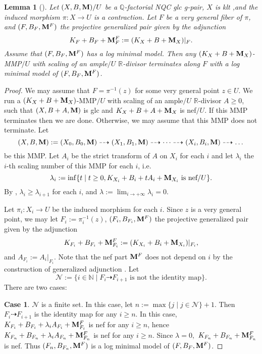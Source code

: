 \documentclass[11pt]{amsart}
\numberwithin{equation}{section}
\newcommand{\Mm}{{\bf{M}}}
\newcommand{\Qq}{\mathbb{Q}}
\newcommand{\Rr}{\mathbb{R}}
\newtheorem{lem}[thm]{Lemma}
\theoremstyle{definition}
\theoremstyle{definition}
\theoremstyle{definition}
\begin{document}
\begin{lem}[{\cite[Version 2, Lemma 2.40]{HL21}}]\label{lem: termination along a very general fiber}
Let $(X,B,\Mm)/U$ be a $\Qq$-factorial NQC glc g-pair, $X$ is klt ,and the induced morphism $\pi: X\rightarrow U$ is a contraction. Let $F$ be a very general fiber of $\pi$, and $(F,B_F,\Mm^F)$ the projective generalized pair given by the adjunction
$$K_F+B_F+\Mm^F_F:=(K_X+B+\Mm_X)|_F.$$
Assume that $(F,B_F,\Mm^F)$ has a log minimal model. Then any $(K_X+B+\Mm_X)$-MMP$/U$ with scaling of an ample$/U$ $\Rr$-divisor terminates along $F$ with a log minimal model of $(F,B_F,\Mm^F)$.
\end{lem}
\begin{proof}
We may assume that $F=\pi^{-1}(z)$ for some very general point $z\in U$. We run a $(K_X+B+\Mm_X)$-MMP$/U$ with scaling of an ample$/U$ $\Rr$-divisor $A\geq 0$, such that $(X,B+A,\Mm)$ is glc and $K_X+B+A+\Mm_X$ is nef$/U$. If this MMP terminates then we are done. Otherwise, we may assume that this MMP does not terminate. Let
$$(X,B,\Mm):=(X_0,B_0,\Mm)\dashrightarrow (X_1,B_1,\Mm)\dashrightarrow\dots\dashrightarrow (X_i,B_i,\Mm)\dashrightarrow\dots$$
be this MMP. Let $A_i$ be the strict transform of $A$ on $X_i$ for each $i$ and let $\lambda_i$ the $i$-th scaling number of this MMP for each $i$, i.e.
$$\lambda_i:=\inf\{t\mid t\geq 0, K_{X_i}+B_i+tA_i+\Mm_{X_i}\text{ is nef/}U\}.$$
By \cite[Remark 3.21, Theorem 4.1]{HL18}, $\lambda_i\geq\lambda_{i+1}$ for each $i$, and $\lambda:=\lim_{i\rightarrow+\infty}\lambda_i=0$. 

Let $\pi_i: X_i\rightarrow U$ be the induced morphism for each $i$. Since $z$ is a very general point, we may let $F_i:=\pi_i^{-1}(z)$, $(F_i,B_{F_i},\Mm^{F})$  the projective generalized pair given by the adjunction
$$K_{F_i}+B_{F_i}+\Mm^{F}_{F_i}:=(K_{X_i}+B_i+\Mm_{X_i})|_{F_i},$$
and $A_{F_i}:=A_i|_{F_i}$. Note that the nef part $\Mm^F$ does not depend on $i$ by the construction of generalized adjunction \cite[Definition 4.7]{BZ16}. Let 
$$\mathcal{N}:=\{i\in\mathbb N\mid F_i\dashrightarrow F_{i+1} \text{ is not the identity map}\}.$$ 
There are two cases:

\medskip

\noindent\textbf{Case 1}. $\mathcal{N}$ is a finite set. In this case, let $n:=\max\{j\mid j\in\mathcal{N}\}+1$. Then $F_i\dashrightarrow F_{i+1}$ is the identity map for any $i\geq n$. In this case, $K_{F_i}+B_{F_i}+\lambda_iA_{F_i}+\Mm^F_{F_i}$ is nef for any $i\geq n$, hence $K_{F_n}+B_{F_n}+\lambda_iA_{F_n}+\Mm^F_{F_n}$ is nef for any $i\geq n$. Since $\lambda=0, $ $K_{F_n}+B_{F_n}+\Mm^F_{F_n}$ is nef. Thus $(F_n,B_{F_n},\Mm^F)$ is a log minimal model of $(F,B_F,\Mm^F)$.


\end{proof}
\end{document}
